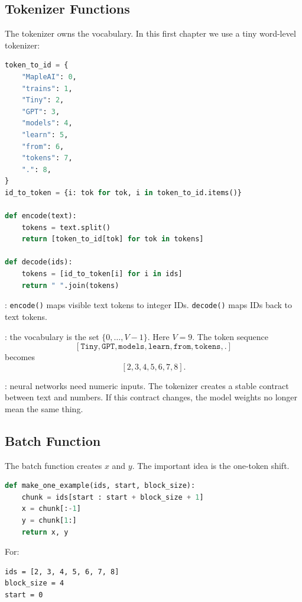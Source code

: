 \subsection{Tokenizer Functions}

The tokenizer owns the vocabulary. In this first chapter we use a tiny word-level tokenizer:

\begin{lstlisting}[language=Python]
token_to_id = {
    "MapleAI": 0,
    "trains": 1,
    "Tiny": 2,
    "GPT": 3,
    "models": 4,
    "learn": 5,
    "from": 6,
    "tokens": 7,
    ".": 8,
}
id_to_token = {i: tok for tok, i in token_to_id.items()}

def encode(text):
    tokens = text.split()
    return [token_to_id[tok] for tok in tokens]

def decode(ids):
    tokens = [id_to_token[i] for i in ids]
    return " ".join(tokens)
\end{lstlisting}

: \texttt{encode()} maps visible text tokens to integer IDs. \texttt{decode()} maps IDs back to text tokens.

: the vocabulary is the set \(\{0,\ldots,V-1\}\). Here \(V=9\). The token sequence
\[
[\texttt{Tiny},\texttt{GPT},\texttt{models},\texttt{learn},\texttt{from},\texttt{tokens},\texttt{.}]
\]
becomes
\[
[2,3,4,5,6,7,8].
\]

: neural networks need numeric inputs. The tokenizer creates a stable contract between text and numbers. If this contract changes, the model weights no longer mean the same thing.

\subsection{Batch Function}

The batch function creates \(x\) and \(y\). The important idea is the one-token shift.

\begin{lstlisting}[language=Python]
def make_one_example(ids, start, block_size):
    chunk = ids[start : start + block_size + 1]
    x = chunk[:-1]
    y = chunk[1:]
    return x, y
\end{lstlisting}

For:

\begin{lstlisting}
ids = [2, 3, 4, 5, 6, 7, 8]
block_size = 4
start = 0
\end{lstlisting}

